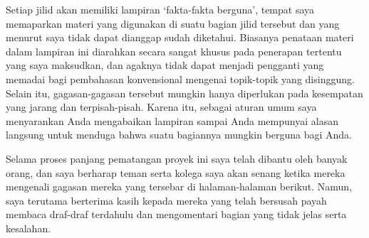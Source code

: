 Setiap jilid akan memiliki lampiran `fakta-fakta berguna', tempat saya
memaparkan materi yang digunakan di suatu bagian jilid tersebut dan yang
menurut saya tidak dapat dianggap sudah diketahui.   Biasanya penataan materi
dalam lampiran ini diarahkan secara sangat khusus pada penerapan tertentu
yang saya maksudkan, dan agaknya tidak dapat menjadi pengganti yang memadai
bagi pembahasan konvensional mengenai topik-topik yang disinggung.
Selain itu, gagasan-gagasan tersebut mungkin hanya diperlukan pada kesempatan
yang jarang dan terpisah-pisah.   Karena itu, sebagai aturan umum saya
menyarankan Anda mengabaikan lampiran sampai Anda mempunyai alasan langsung
untuk menduga bahwa suatu bagiannya mungkin berguna bagi Anda.
     
Selama proses panjang pematangan proyek ini saya telah dibantu oleh banyak
orang, dan saya berharap teman serta kolega saya akan senang ketika mereka
mengenali gagasan mereka yang tersebar di halaman-halaman berikut.   Namun,
saya terutama berterima kasih kepada mereka yang telah bersusah payah membaca
draf-draf terdahulu dan mengomentari bagian yang tidak jelas serta kesalahan.
     
     

     
